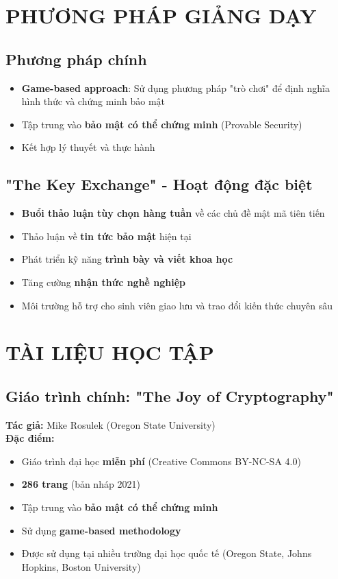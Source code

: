 \section{PHƯƠNG PHÁP GIẢNG DẠY}

\subsection{Phương pháp chính}
\begin{itemize}
\item \textbf{Game-based approach}: Sử dụng phương pháp "trò chơi" để định nghĩa hình thức và chứng minh bảo mật
\item Tập trung vào \textbf{bảo mật có thể chứng minh} (Provable Security)
\item Kết hợp lý thuyết và thực hành
\end{itemize}

\subsection{"The Key Exchange" - Hoạt động đặc biệt}
\begin{itemize}
\item \textbf{Buổi thảo luận tùy chọn hàng tuần} về các chủ đề mật mã tiên tiến
\item Thảo luận về \textbf{tin tức bảo mật} hiện tại
\item Phát triển kỹ năng \textbf{trình bày và viết khoa học}
\item Tăng cường \textbf{nhận thức nghề nghiệp}
\item Môi trường hỗ trợ cho sinh viên giao lưu và trao đổi kiến thức chuyên sâu
\end{itemize}

\section{TÀI LIỆU HỌC TẬP}

\subsection{Giáo trình chính: "The Joy of Cryptography"}
\textbf{Tác giả:} Mike Rosulek (Oregon State University)\\
\textbf{Đặc điểm:}
\begin{itemize}
\item Giáo trình đại học \textbf{miễn phí} (Creative Commons BY-NC-SA 4.0)
\item \textbf{286 trang} (bản nháp 2021)
\item Tập trung vào \textbf{bảo mật có thể chứng minh}
\item Sử dụng \textbf{game-based methodology}
\item Được sử dụng tại nhiều trường đại học quốc tế (Oregon State, Johns Hopkins, Boston University)
\end{itemize}

